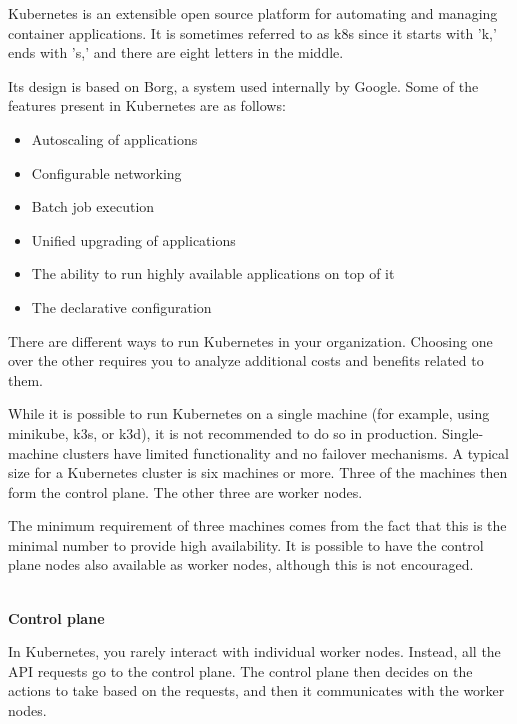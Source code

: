 
Kubernetes is an extensible open source platform for automating and managing container applications. It is sometimes referred to as k8s since it starts with 'k,' ends with 's,' and there are eight letters in the middle.

Its design is based on Borg, a system used internally by Google. Some of the features present in Kubernetes are as follows:

\begin{itemize}
\item 
Autoscaling of applications

\item 
Configurable networking

\item 
Batch job execution

\item 
Unified upgrading of applications

\item 
The ability to run highly available applications on top of it

\item 
The declarative configuration
\end{itemize}

There are different ways to run Kubernetes in your organization. Choosing one over the other requires you to analyze additional costs and benefits related to them.


While it is possible to run Kubernetes on a single machine (for example, using minikube, k3s, or k3d), it is not recommended to do so in production. Single-machine clusters have limited functionality and no failover mechanisms. A typical size for a Kubernetes cluster is six machines or more. Three of the machines then form the control plane. The other three are worker nodes.

The minimum requirement of three machines comes from the fact that this is the minimal number to provide high availability. It is possible to have the control plane nodes also available as worker nodes, although this is not encouraged.

\hspace*{\fill} \\ %
\noindent
\textbf{Control plane}

In Kubernetes, you rarely interact with individual worker nodes. Instead, all the API requests go to the control plane. The control plane then decides on the actions to take based on the requests, and then it communicates with the worker nodes.


